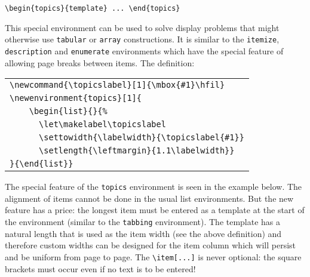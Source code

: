 \medskip

\verb"\begin{topics}{template} ... \end{topics}"

\noindent This special environment can be used to solve display problems
that might otherwise use {\tt tabular} or {\tt array} constructions. It
is similar to the {\tt itemize}, {\tt description} and {\tt enumerate}
environments which have the special feature of allowing page breaks
between items. The definition:

\begin{center}\begin{tabular}{l}
\verb"\newcommand{\topicslabel}[1]{\mbox{#1}\hfil}" \\
\verb"\newenvironment{topics}[1]{" \\
\verb"    \begin{list}{}{%" \\
\verb"      \let\makelabel\topicslabel" \\
\verb"      \settowidth{\labelwidth}{\topicslabel{#1}}" \\
\verb"      \setlength{\leftmargin}{1.1\labelwidth}}" \\
\verb"}{\end{list}}"
\end{tabular}\end{center}

The special feature of the {\tt topics} environment is seen in the
example below. The alignment of items cannot be done in the usual list
environments. But the new feature has a price: the longest item must be
entered as a template at the start of the environment (similar to the
{\tt tabbing} environment). The template has a natural length that is
used as the item width (see the above definition) and therefore custom
widths can be designed for the item column which will persist and be
uniform from page to page. The \verb"\item[...]" is never optional: the
square brackets must occur even if no text is to be entered!


\newcommand{\topicslabel}[1]{\mbox{#1}\hfil}
\newenvironment{topics}[1]{
    \begin{list}{}{%
      \let\makelabel\topicslabel
      \settowidth{\labelwidth}{\topicslabel{#1}}
      \setlength{\leftmargin}{1.1\labelwidth}}
}{\end{list}}

